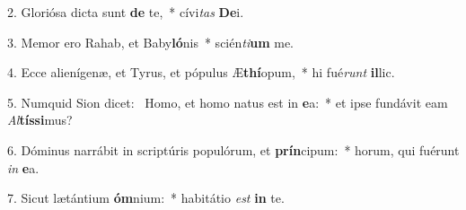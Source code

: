 2. Gloriósa dicta sunt \textbf{de} te,~*  cívi\textit{tas} \textbf{De}i.\

3. Memor ero Rahab, et Baby\textbf{ló}nis~*  scién\textit{ti}\textbf{um} me.\

4. Ecce alienígenæ, et Tyrus, et pópulus Æ\textbf{thí}opum,~*  hi fué\textit{runt} \textbf{il}lic.\

5. Numquid Sion dicet: \dag\  Homo, et homo natus est in \textbf{e}a:~*  et ipse fundávit eam \textit{Al}\textbf{tís}\textbf{si}mus?\

6. Dóminus narrábit in scriptúris populórum, et \textbf{prín}cipum:~*  horum, qui fuérunt \textit{in} \textbf{e}a.\

7. Sicut lætántium \textbf{óm}nium:~*  habitátio \textit{est} \textbf{in} te.\

